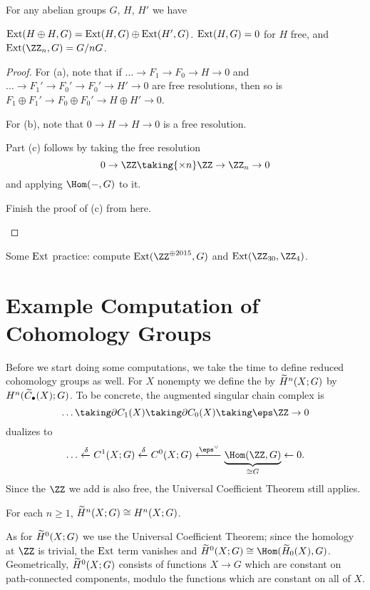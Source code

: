 \begin{lemma}
	For any abelian groups $G$, $H$, $H'$ we have
	\begin{enumerate}[(a)]
		\ii $\operatorname{Ext}(H \oplus H, G) = \operatorname{Ext}(H, G) \oplus \operatorname{Ext}(H', G)$.
		\ii $\operatorname{Ext}(H,G) = 0$ for $H$ free, and
		\ii $\Ext(\Zc n, G) = G / nG$.
	\end{enumerate}
\end{lemma}
\begin{proof}
	For (a), note that if $\dots \to F_1 \to F_0 \to H \to 0$
	and $\dots \to F_1' \to F_0' \to F_0' \to H' \to 0$ are free resolutions,
	then so is $F_1 \oplus F_1' \to F_0 \oplus F_0' \to H \oplus H' \to 0$.

	For (b), note that $0 \to H \to H \to 0$ is a free resolution.
	
	Part (c) follows by taking the free resolution
	\[ 0 \to \ZZ \taking{\times n} \ZZ \to \Zc n \to 0 \]
	and applying $\Hom(-,G)$ to it.
	\begin{ques}
		Finish the proof of (c) from here. \qedhere
	\end{ques}
\end{proof}

\begin{ques}
	Some $\operatorname{Ext}$ practice: compute
	$\Ext(\ZZ^{\oplus 2015}, G)$ and $\Ext(\Zc{30}, \Zc 4)$.
\end{ques}

\section{Example Computation of Cohomology Groups}
Before we start doing some computations, we take the time
to define reduced cohomology groups as well.
For $X$ nonempty we define the  by $\widetilde H^n(X;G)$
by $H^n(\widetilde C_\bullet(X); G)$.
To be concrete, the augmented singular chain complex is
\[ \dots \taking\partial C_1(X) \taking\partial C_0(X) \taking\eps \ZZ \to 0 \]
dualizes to
\[
	\dots \xleftarrow\delta C^1(X;G) \xleftarrow\delta C^0(X;G)
	\xleftarrow{\eps^\vee} \underbrace{\Hom(\ZZ, G)}_{\cong G}
	\leftarrow 0.
\]
Since the $\ZZ$ we add is also free,
the Universal Coefficient Theorem still applies.

\begin{ques}
	For each $n \ge 1$, $\widetilde H^n(X;G) \cong H^n(X;G)$.
\end{ques}

As for $\widetilde H^0(X;G)$ we use the Universal Coefficient Theorem;
since the homology at $\ZZ$ is trivial, the $\operatorname{Ext}$ term vanishes and
$\wt H^0(X;G) \cong \Hom(\wt H_0(X), G)$.
Geometrically, $\widetilde H^0(X;G)$ consists of functions $X \to G$
which are constant on path-connected components,
modulo the functions which are constant on all of $X$.

